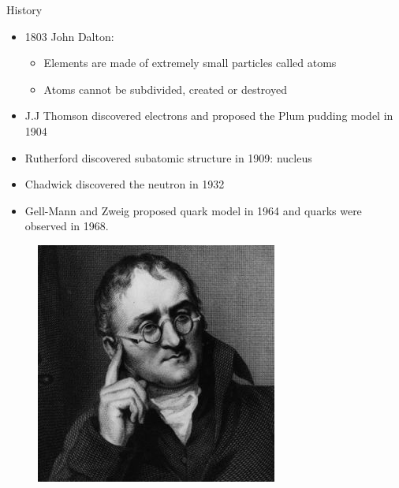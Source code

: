 \documentclass[10pt]{beamer}
\begin{document}
{\begin{frame}{History}
    \begin{itemize}
        \item 1803 John Dalton:
            \begin{itemize}
                \item Elements are made of extremely small particles called atoms
                \item Atoms cannot be subdivided, created or destroyed
            \end{itemize}
        \item J.J Thomson discovered electrons and proposed the Plum pudding model in 1904
        \item Rutherford discovered subatomic structure in 1909: nucleus
        \item Chadwick discovered the neutron in 1932
        \item Gell-Mann and Zweig proposed quark model in 1964 and quarks were observed in 1968.
    \end{itemize}
    \begin{figure}
        \includegraphics[height=0.25\textheight]{figures/Dalton.jpg}

\end{figure}
\end{frame}}
\end{document}
